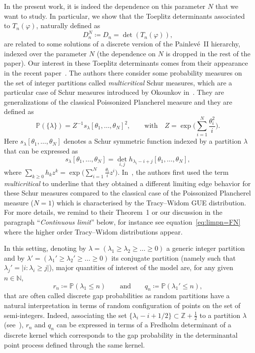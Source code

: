 \documentclass[pdftex]{sigma}%
\numberwithin{equation}{section}
\begin{document}
In the present work, it is indeed the dependence on this parameter $N$ that we want to study. In particular, we show that the Toeplitz determinants associated to $T_n(\varphi)$, naturally defined as
 \begin{equation}
 \label{def:Dn}
 D_n^N \coloneqq D_n= \det (T_n(\varphi)),
 \end{equation}
are related to some solutions of a discrete version of the Painlev\'e~II hierarchy, indexed over the parameter $N$ (the dependence on $N$ is dropped in the rest of the paper). Our interest in these Toeplitz determinants comes from their appearance in the recent paper~\cite{betea2021multicritical}. The authors there consider some probability measures on the set of integer partitions called \textit{multicritical} Schur measures, which are a particular case of Schur measures introduced by Okounkov in~\cite{Okunkov}.
They are generalizations of the classical Poissonized Plancherel measure and they are defined as
\begin{equation}\label{def:P}
\mathbb{P}(\lbrace \lambda \rbrace ) = Z^{-1} s_{\lambda}[\theta_1,\dots, \theta_N]^2,\qquad\text{with}\quad
Z=\exp\Bigg(\sum_{i=1}^N\frac{\theta_i^2}{i}\Bigg).
\end{equation}
Here $s_{\lambda}[\theta_1,\dots, \theta_N]$ denotes a Schur symmetric function indexed by a partition $\lambda$ that can be expressed as
\[
s_{\lambda}[\theta_1,\dots, \theta_N]=\det_{i,j}h_{\lambda_i-i+j}[\theta_1,\dots,\theta_N],
\]
where $\sum_{k\geq 0}h_k z^k = \exp\big(\sum_{i=1}^N\frac{\theta_i}{i}z^i\big)$. In~\cite{betea2021multicritical}, the authors first used the term \textit{multicritical} to underline that they obtained a different limiting edge behavior for these Schur measures compared to the classical case of the Poissonized Plancherel measure ($N=1$) which is characterised by the Tracy--Widom GUE distribution.
	For more details, we remind to their Theorem~1 or our discussion in the paragraph ``\textit{Continuous limit}'' below, for instance see equation~\eqref{eq:limpn=FN} where the higher order Tracy--Widom distributions appear.

In this setting, denoting by $\lambda=(\lambda_1\geq\lambda_2\geq\dots\geq 0)$ a generic integer partition and by $\lambda'=(\lambda_1'\geq \lambda_2'\geq\dots \geq 0)$ its conjugate partition (namely such that $\lambda_j'=|i:\lambda_i\geq j|$), major quantities of interest of the model are, for any given $n \in \mathbb{N}$,
\begin{equation}
r_n \coloneqq \mathbb{P}(\lambda_1 \leq n) \qquad \text{and}\qquad
q_n\coloneqq \mathbb{P}(\lambda_1' \leq n),
\label{def:pnqn}
\end{equation}
that are often called discrete gap probabilities as random partitions have a natural interpretation in terms of random configuration of points on the set of semi-integers. Indeed, associating the set $\{\lambda_i-i+1/2\}\subset \mathbb{Z}+\frac{1}{2}$ to a partition $\lambda$ (see~\cite{Okunkov}), $r_n$ and $q_n$ can be expressed in terms of a Fredholm determinant of a discrete kernel which corresponds to the gap probability in the determinantal point process defined through the same kernel.
\end{document}
